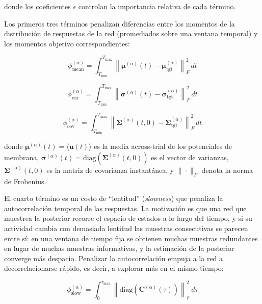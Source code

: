 donde los coeficientes $\epsilon$ controlan la importancia relativa de cada término. 

Los primeros tres términos penalizan diferencias entre los momentos de la distribución de respuestas de la red (promediados sobre una ventana temporal) y los momentos objetivo correspondientes:

\begin{equation}
\phi_{\text{mean}}^{(\alpha)} = \int_{T_{\min}}^{T_{\max}} \left\| \boldsymbol{\mu}^{(\alpha)}(t) - \boldsymbol{\mu}_{\text{tgt}}^{(\alpha)} \right\|_F^2 \, dt
\label{eq:cost_mean}
\end{equation}

\begin{equation}
\phi_{\text{var}}^{(\alpha)} = \int_{T_{\min}}^{T_{\max}} \left\| \boldsymbol{\sigma}^{(\alpha)}(t) - \boldsymbol{\sigma}_{\text{tgt}}^{(\alpha)} \right\|_F^2 \, dt
\label{eq:cost_var}
\end{equation}

\begin{equation}
\phi_{\text{cov}}^{(\alpha)} = \int_{T_{\min}}^{T_{\max}} \left\| \boldsymbol{\Sigma}^{(\alpha)}(t, 0) - \boldsymbol{\Sigma}_{\text{tgt}}^{(\alpha)} \right\|_F^2 \, dt
\label{eq:cost_cov}
\end{equation}

donde $\boldsymbol{\mu}^{(\alpha)}(t) = \langle \mathbf{u}(t) \rangle$ es la media across-trial de los potenciales de membrana, $\boldsymbol{\sigma}^{(\alpha)}(t) = \text{diag}(\boldsymbol{\Sigma}^{(\alpha)}(t, 0))$ es el vector de varianzas, $\boldsymbol{\Sigma}^{(\alpha)}(t, 0)$ es la matriz de covarianza instantánea, y $\|\cdot\|_F$ denota la norma de Frobenius.

El cuarto término es un costo de ``lentitud'' (\textit{slowness}) que penaliza la autocorrelación temporal de las respuestas. La motivación es que una red que muestrea la posterior recorre el espacio de estados a lo largo del tiempo, y si su actividad cambia con demasiada lentitud las muestras consecutivas se parecen entre sí: en una ventana de tiempo fija se obtienen muchas muestras redundantes en lugar de muchas muestras informativas, y la estimación de la posterior converge más despacio. Penalizar la autocorrelación empuja a la red a decorrelacionarse rápido, es decir, a explorar más en el mismo tiempo:

\begin{equation}
\phi_{\text{slow}}^{(\alpha)} = \int_0^{\tau_{\max}} \left\| \text{diag}(\mathbf{C}^{(\alpha)}(\tau)) \right\|_F^2 \, d\tau
\label{eq:cost_slow}
\end{equation}

